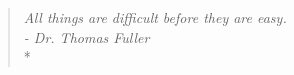 \phantom{.}
\vspace{4in}

\begin{singlespace}
\begin{quote}
  \textit{All things are difficult before they are easy.}\\
  \textit{- Dr. Thomas Fuller}\\*
\end{quote}
\end{singlespace}

%
